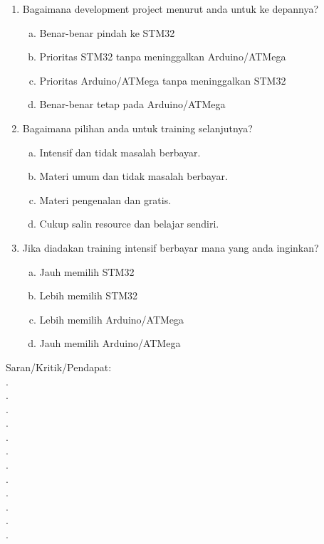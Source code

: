 \documentclass[12pt,]{article}
\begin{document}
\begin{enumerate}
		\item Bagaimana development project menurut anda untuk ke depannya?
		\begin{enumerate}[(a)]
			\item Benar-benar pindah ke STM32
			\item Prioritas STM32 tanpa meninggalkan Arduino/ATMega
			\item Prioritas Arduino/ATMega tanpa meninggalkan STM32
			\item Benar-benar tetap pada Arduino/ATMega
		\end{enumerate}
	
		\item Bagaimana pilihan anda untuk training selanjutnya?
		\begin{enumerate}[(a)]
			\item Intensif dan tidak masalah berbayar.
			\item Materi umum dan tidak masalah berbayar.
			\item Materi pengenalan dan gratis.
			\item Cukup salin resource dan belajar sendiri.
		\end{enumerate}
	
		\item Jika diadakan training intensif berbayar mana yang anda inginkan?
		\begin{enumerate}[(a)]
			\item Jauh memilih STM32
			\item Lebih memilih STM32
			\item Lebih memilih Arduino/ATMega
			\item Jauh memilih Arduino/ATMega
		\end{enumerate}
	
	\end{enumerate}

	Saran/Kritik/Pendapat: \\
	.\dotfill \\
	.\dotfill \\
	.\dotfill \\
	.\dotfill \\
	.\dotfill \\
	.\dotfill \\
	.\dotfill \\
	.\dotfill \\
	.\dotfill \\
	.\dotfill \\
	.\dotfill \\
	.\dotfill \\
	
\end{document}
